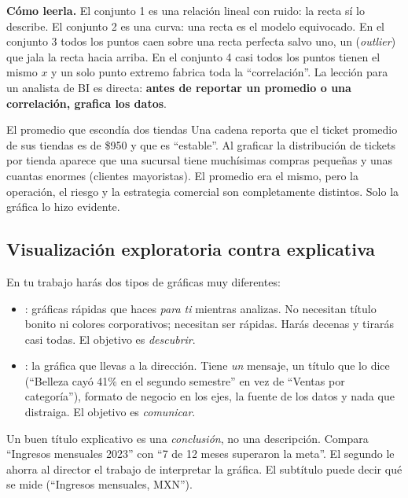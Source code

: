 \textbf{Cómo leerla.} El conjunto 1 es una relación lineal con ruido: la
recta sí lo describe. El conjunto 2 es una curva: una recta es el modelo
equivocado. En el conjunto 3 todos los puntos caen sobre una recta perfecta
salvo uno, un  (\emph{outlier}) que jala la recta
hacia arriba. En el conjunto 4 casi todos los puntos tienen el mismo $x$ y un
solo punto extremo fabrica toda la ``correlación''. La lección para un
analista de BI es directa: \textbf{antes de reportar un promedio o una
correlación, grafica los datos}.

\begin{negocio}{El promedio que escondía dos tiendas}
Una cadena reporta que el ticket promedio de sus tiendas es de \$950 y que
es ``estable''. Al graficar la distribución de tickets por tienda aparece que
una sucursal tiene muchísimas compras pequeñas y unas cuantas enormes
(clientes mayoristas). El promedio era el mismo, pero la operación, el
riesgo y la estrategia comercial son completamente distintos. Solo la
gráfica lo hizo evidente.
\end{negocio}

\subsection{Visualización exploratoria contra explicativa}

En tu trabajo harás dos tipos de gráficas muy diferentes:

\begin{itemize}
  \item {}: gráficas rápidas que haces
        \emph{para ti} mientras analizas. No necesitan título bonito ni
        colores corporativos; necesitan ser rápidas. Harás decenas y
        tirarás casi todas. El objetivo es \emph{descubrir}.
  \item {}: la gráfica que llevas a la
        dirección. Tiene \emph{un} mensaje, un título que lo dice
        (``Belleza cayó 41\% en el segundo semestre'' en vez de ``Ventas por
        categoría''), formato de negocio en los ejes, la fuente de los datos
        y nada que distraiga. El objetivo es \emph{comunicar}.
\end{itemize}

\begin{consejo}
Un buen título explicativo es una \emph{conclusión}, no una descripción.
Compara ``Ingresos mensuales 2023'' con ``7 de 12 meses superaron la meta''.
El segundo le ahorra al director el trabajo de interpretar la gráfica. El
subtítulo puede decir qué se mide (``Ingresos mensuales, MXN'').
\end{consejo}

